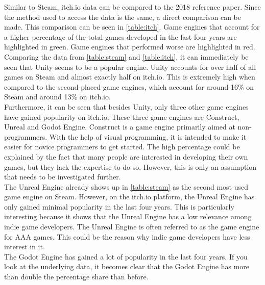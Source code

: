 Similar to Steam, itch.io data can be compared to the 2018 reference paper.
Since the method used to access the data is the same, a direct comparison can be made.
This comparison can be seen in \autoref{table:itch}.
Game engines that account for a higher percentage of the total games developed in the last four years are highlighted in green.
Game engines that performed worse are highlighted in red.
Comparing the data from \autoref{table:steam} and \autoref{table:itch}, it can immediately be seen that Unity seems to be a popular engine.
Unity accounts for over half of all games on Steam and almost exactly half on itch.io.
This is extremely high when compared to the second-placed game engines, which account for around 16\% on Steam and around 13\% on itch.io.\\

Furthermore, it can be seen that besides Unity, only three other game engines have gained popularity on itch.io.
These three game engines are Construct, Unreal and Godot Engine.
Construct is a game engine primarily aimed at non-programmers.
With the help of visual programming, it is intended to make it easier for novice programmers to get started.
The high percentage could be explained by the fact that many people are interested in developing their own games, but they lack the expertise to do so.
However, this is only an assumption that needs to be investigated further. \\

The Unreal Engine already shows up in \autoref{table:steam} as the second most used game engine on Steam.
However, on the itch.io platform, the Unreal Engine has only gained minimal popularity in the last four years.
This is particularly interesting because it shows that the Unreal Engine has a low relevance among indie game developers.
The Unreal Engine is often referred to as the game engine for AAA games.
This could be the reason why indie game developers have less interest in it. \\


The Godot Engine has gained a lot of popularity in the last four years.
If you look at the underlying data, it becomes clear that the Godot Engine has more than double the percentage share than before.
